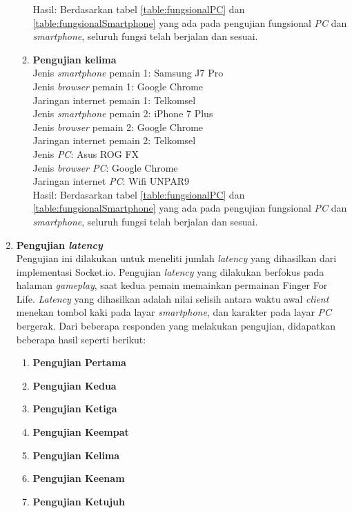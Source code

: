 \begin{enumerate}
\begin{enumerate}
		Hasil: Berdasarkan tabel \ref{table:fungsionalPC} dan \ref{table:fungsionalSmartphone} yang ada pada pengujian fungsional \textit{PC} dan \textit{smartphone}, seluruh fungsi telah berjalan dan sesuai.
		
		\item \textbf{Pengujian kelima} \\
		Jenis \textit{smartphone} pemain 1: Samsung J7 Pro\\
		Jenis \textit{browser} pemain 1: Google Chrome\\
		Jaringan internet pemain 1: Telkomsel\\
		
		Jenis \textit{smartphone} pemain 2: iPhone 7 Plus\\
		Jenis \textit{browser} pemain 2: Google Chrome\\
		Jaringan internet pemain 2: Telkomsel\\
		
		Jenis \textit{PC}: Asus ROG FX\\
		Jenis \textit{browser PC}: Google Chrome\\
		Jaringan internet \textit{PC}: Wifi UNPAR9\\
		
		Hasil: Berdasarkan tabel \ref{table:fungsionalPC} dan \ref{table:fungsionalSmartphone} yang ada pada pengujian fungsional \textit{PC} dan \textit{smartphone}, seluruh fungsi telah berjalan dan sesuai.
	\end{enumerate}
	
	
	\item \textbf{Pengujian \textit{latency}} \\
	Pengujian ini dilakukan untuk meneliti jumlah \textit{latency} yang dihasilkan dari implementasi Socket.io. Pengujian \textit{latency} yang dilakukan berfokus pada halaman \textit{gameplay}, saat kedua pemain memainkan permainan Finger For Life. \textit{Latency} yang dihasilkan adalah nilai selisih antara waktu awal \textit{client} menekan tombol kaki pada layar \textit{smartphone}, dan karakter pada layar \textit{PC} bergerak. Dari beberapa responden yang melakukan pengujian, didapatkan beberapa hasil seperti berikut:
	
	\begin{enumerate}
		\item \textbf{Pengujian Pertama}
		
		\item \textbf{Pengujian Kedua}
		
		\item \textbf{Pengujian Ketiga}
		
		\item \textbf{Pengujian Keempat}
		
		\item \textbf{Pengujian Kelima}
		
		\item \textbf{Pengujian Keenam}
		
		\item \textbf{Pengujian Ketujuh}
	\end{enumerate}
\end{enumerate}